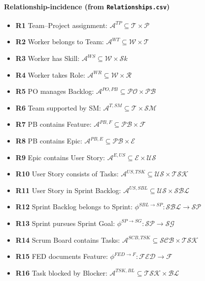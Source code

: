\documentclass[11pt,a4paper]{article}
\begin{document}
\paragraph{Relationship-incidence (from \texttt{Relationships.csv})}
\begin{itemize}[leftmargin=2.2em]
  \item \textbf{R1} Team--Project assignment: $\mathcal{A}^{TP}\subseteq \mathcal{T}\times\mathcal{P}$
  \item \textbf{R2} Worker belongs to Team: $\mathcal{A}^{WT}\subseteq \mathcal{W}\times\mathcal{T}$
  \item \textbf{R3} Worker has Skill: $\mathcal{A}^{WS}\subseteq \mathcal{W}\times\mathcal{S}\!k$
  \item \textbf{R4} Worker takes Role: $\mathcal{A}^{WR}\subseteq \mathcal{W}\times\mathcal{R}$
  \item \textbf{R5} PO manages Backlog: $\mathcal{A}^{PO,PB}\subseteq \mathcal{PO}\times\mathcal{PB}$
  \item \textbf{R6} Team supported by SM: $\mathcal{A}^{T,SM}\subseteq \mathcal{T}\times\mathcal{SM}$
  \item \textbf{R7} PB contains Feature: $\mathcal{A}^{PB,F}\subseteq \mathcal{PB}\times\mathcal{F}$
  \item \textbf{R8} PB contains Epic: $\mathcal{A}^{PB,E}\subseteq \mathcal{PB}\times\mathcal{E}$
  \item \textbf{R9} Epic contains User Story: $\mathcal{A}^{E,US}\subseteq \mathcal{E}\times\mathcal{US}$
  \item \textbf{R10} User Story consists of Tasks: $\mathcal{A}^{US,TSK}\subseteq \mathcal{US}\times\mathcal{TSK}$
  \item \textbf{R11} User Story in Sprint Backlog: $\mathcal{A}^{US,SBL}\subseteq \mathcal{US}\times\mathcal{SBL}$
  \item \textbf{R12} Sprint Backlog belongs to Sprint: $\phi^{SBL\!\to\!SP}:\mathcal{SBL}\to\mathcal{SP}$
  \item \textbf{R13} Sprint pursues Sprint Goal: $\phi^{SP\!\to\!SG}:\mathcal{SP}\to\mathcal{SG}$
  \item \textbf{R14} Scrum Board contains Tasks: $\mathcal{A}^{SCB,TSK}\subseteq \mathcal{SCB}\times\mathcal{TSK}$
  \item \textbf{R15} FED documents Feature: $\phi^{FED\!\to\!F}:\mathcal{FED}\to\mathcal{F}$
  \item \textbf{R16} Task blocked by Blocker: $\mathcal{A}^{TSK,BL}\subseteq \mathcal{TSK}\times\mathcal{BL}$

\end{itemize}
\end{document}
